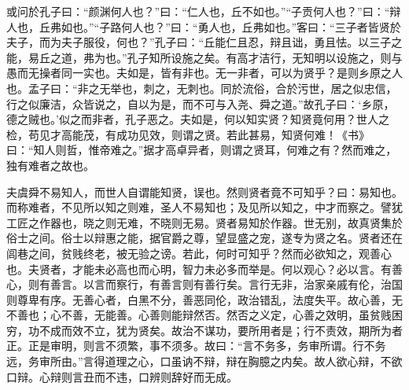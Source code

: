 \documentclass[]{article}
\begin{document}
或问於孔子曰：``颜渊何人也？''曰：``仁人也，丘不如也。''``子贡何人也？''曰：``辩人也，丘弗如也。''``子路何人也？''曰：``勇人也，丘弗如也。''客曰：``三子者皆贤於夫子，而为夫子服役，何也？''孔子曰：``丘能仁且忍，辩且诎，勇且怯。以三子之能，易丘之道，弗为也。''孔子知所设施之矣。有高才洁行，无知明以设施之，则与愚而无操者同一实也。夫如是，皆有非也。无一非者，可以为贤乎？是则乡原之人也。孟子曰：``非之无举也，刺之，无刺也。同於流俗，合於污世，居之似忠信，行之似廉洁，众皆说之，自以为是，而不可与入尧、舜之道。''故孔子曰：`乡原，德之贼也。'似之而非者，孔子恶之。夫如是，何以知实贤？知贤竟何用？世人之检，苟见才高能茂，有成功见效，则谓之贤。若此甚易，知贤何难！《书》曰：``知人则哲，惟帝难之。''据才高卓异者，则谓之贤耳，何难之有？然而难之，独有难者之故也。

夫虞舜不易知人，而世人自谓能知贤，误也。然则贤者竟不可知乎？曰：易知也。而称难者，不见所以知之则难，圣人不易知也；及见所以知之，中才而察之。譬犹工匠之作器也，晓之则无难，不晓则无易。贤者易知於作器。世无别，故真贤集於俗士之间。俗士以辩惠之能，据官爵之尊，望显盛之宠，遂专为贤之名。贤者还在闾巷之间，贫贱终老，被无验之谤。若此，何时可知乎？然而必欲知之，观善心也。夫贤者，才能未必高也而心明，智力未必多而举是。何以观心？必以言。有善心，则有善言。以言而察行，有善言则有善行矣。言行无非，治家亲戚有伦，治国则尊卑有序。无善心者，白黑不分，善恶同伦，政治错乱，法度失平。故心善，无不善也；心不善，无能善。心善则能辩然否。然否之义定，心善之效明，虽贫贱困穷，功不成而效不立，犹为贤矣。故治不谋功，要所用者是；行不责效，期所为者正。正是审明，则言不须繁，事不须多。故曰：``言不务多，务审所谓。行不务远，务审所由。''言得道理之心，口虽讷不辩，辩在胸臆之内矣。故人欲心辩，不欲口辩。心辩则言丑而不违，口辨则辞好而无成。
\end{document}
